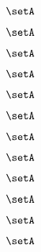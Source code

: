 \begin{forslides}
\begin{forslides}
    \begin{equation}
        \label{eq:slides-translation-133}
        \setA
    \end{equation}

    \begin{equation}
        \label{eq:slides-translation-134}
        \setA
    \end{equation}

    \begin{equation}
        \label{eq:slides-translation-135}
        \setA
    \end{equation}

    \begin{equation}
        \label{eq:slides-translation-136}
        \setA
    \end{equation}

    \begin{equation}
        \label{eq:slides-translation-137}
        \setA
    \end{equation}

    \begin{equation}
        \label{eq:slides-translation-138}
        \setA
    \end{equation}

    \begin{equation}
        \label{eq:slides-translation-139}
        \setA
    \end{equation}

    \begin{equation}
        \label{eq:slides-translation-140}
        \setA
    \end{equation}

    \begin{equation}
        \label{eq:slides-translation-141}
        \setA
    \end{equation}

    \begin{equation}
        \label{eq:slides-translation-142}
        \setA
    \end{equation}

    \begin{equation}
        \label{eq:slides-translation-143}
        \setA
    \end{equation}

    \begin{equation}
        \label{eq:slides-translation-144}
        \setA
    \end{equation}


\end{forslides}
\end{forslides}

